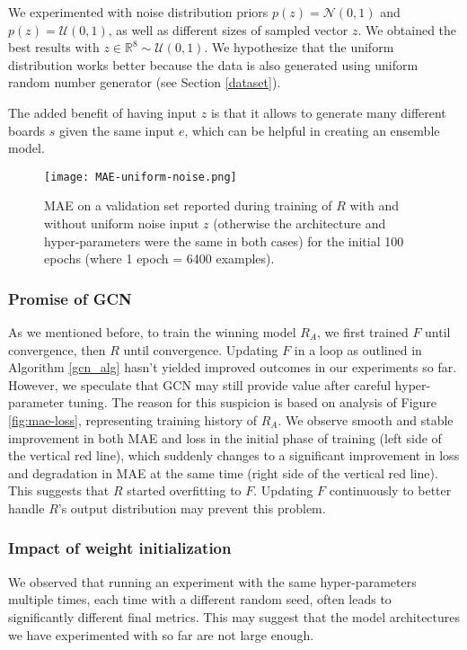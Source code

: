 \documentclass[conference]{IEEEtran}
\begin{document}
We experimented with noise distribution priors $p(z) = \mathcal{N}(0,1)$ and $p(z) = \mathcal{U}(0,1)$, as well as different sizes of sampled vector $z$. We obtained the best results with $z \in \mathbb{R}^8 \sim \mathcal{U}(0,1)$. We hypothesize that the uniform distribution works better because the data is also generated using uniform random number generator (see Section \ref{dataset}).

The added benefit of having input $z$ is that it allows to generate many different boards $s$ given the same input $e$, which can be helpful in creating an ensemble model.

\begin{figure}[!h]
    \centering
    \texttt{[image: MAE-uniform-noise.png]}
    \caption{MAE on a validation set reported during training of $R$ with and without uniform noise input $z$ (otherwise the architecture and hyper-parameters were the same in both cases) for the initial 100 epochs (where 1 epoch = 6400 examples).}
    \label{fig:noise}
\end{figure}


\subsubsection{Promise of GCN}
\label{promise}
As we mentioned before, to train the winning model $R_A$, we first trained $F$ until convergence, then $R$ until convergence. Updating $F$ in a loop as outlined in Algorithm \ref{gcn_alg} hasn't yielded improved outcomes in our experiments so far. However, we speculate that GCN may still provide value after careful hyper-parameter tuning. The reason for this suspicion is based on analysis of Figure \ref{fig:mae-loss}, representing training history of $R_A$. We observe smooth and stable improvement in both MAE and loss in the initial phase of training (left side of the vertical red line), which suddenly changes to a significant improvement in loss and degradation in MAE at the same time (right side of the vertical red line). This suggests that $R$ started overfitting to $F$. Updating $F$ continuously to better handle $R$'s output distribution may prevent this problem.


\subsubsection{Impact of weight initialization}
We observed that running an experiment with the same hyper-parameters multiple times, each time with a different random seed, often leads to significantly different final metrics. This may suggest that the model architectures we have experimented with so far are not large enough.\cite{frankle2019lottery}
\end{document}
